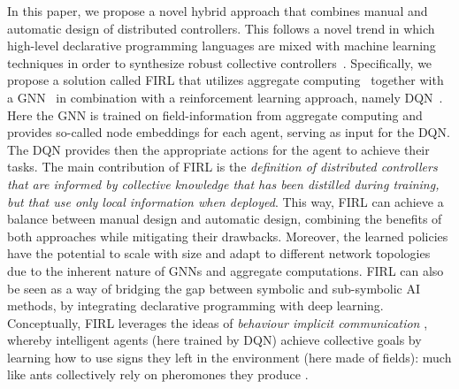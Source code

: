 In this paper, we propose a novel hybrid approach that combines manual and automatic design of distributed controllers.
This follows a novel trend in which high-level declarative programming languages are mixed with machine learning techniques in order to synthesize robust collective controllers~\cite{DBLP:conf/acsos/Aguzzi21,DBLP:conf/icdcs/AguzziCV22,DBLP:conf/coordination/AguzziCV22}.
Specifically, we propose a solution called \ac{FIRL} that utilizes aggregate computing~\cite{Beal2015Computer} together with a \ac{GNN}~\cite{Zhou2020AIOpen} in combination with a reinforcement learning approach, namely \ac{DQN}~\cite{mnih2015human}. 
 Here the \ac{GNN} is trained on field-information from aggregate computing and provides so-called node embeddings for each agent, serving as input for the \ac{DQN}. 
 The \ac{DQN} provides then the appropriate actions for the agent to achieve their tasks.
%
The main contribution of \ac{FIRL} is the \emph{definition of distributed controllers that are informed by collective knowledge that has been distilled during training, but that use only local information when deployed}. This way, \ac{FIRL} can achieve a balance between manual design and automatic design, combining the benefits of both approaches while mitigating their drawbacks.
Moreover, the learned policies have the potential to scale with size and adapt to different network topologies due to the inherent nature of GNNs and aggregate computations.
\ac{FIRL} can also be seen as a way of bridging the gap between symbolic and sub-symbolic AI methods, by integrating declarative programming with deep learning.
%
Conceptually, \ac{FIRL} leverages the ideas of \emph{behaviour implicit communication} \cite{DBLP:journals/ijaci/CastelfranchiPT10} \cite{DBLP:conf/e4mas/TummoliniCRVO04}, whereby intelligent agents (here trained by DQN) achieve collective goals by learning how to use signs they left in the environment (here made of fields): much like ants collectively rely on pheromones they produce \cite{DBLP:journals/anor/Parunak97}.

